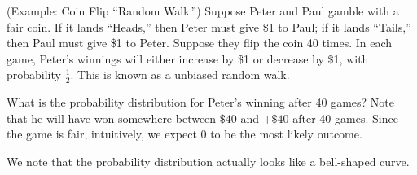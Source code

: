 \documentclass[letterpaper]{article}
\begin{document}
\begin{mdframed}[]
    (Example: Coin Flip ``Random Walk.'') Suppose Peter and Paul gamble with a fair coin. If it lands ``Heads,'' then Peter must give \$1 to Paul; if it lands ``Tails,'' then Paul must give \$1 to Peter. Suppose they flip the coin 40 times. In each game, Peter's winnings will either increase by \$1 or decrease by \$1, with probability $\frac{1}{2}$. This is known as a unbiased random walk. 

    \bigskip 

    What is the probability distribution for Peter's winning after 40 games? Note that he will have won somewhere between $\$40$ and $+\$40$ after 40 games. Since the game is fair, intuitively, we expect 0 to be the most likely outcome.  

    \bigskip 

    We note that the probability distribution actually looks like a bell-shaped curve.
\end{mdframed}
\end{document}

